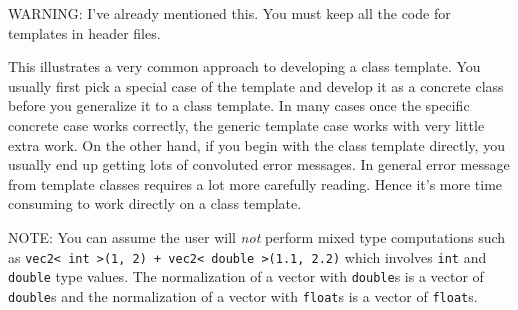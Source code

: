 
WARNING: I've already mentioned this. You must keep all the code for
templates in header files. 

This illustrates a very common approach to developing a class template.
You usually first pick a special case of the template and develop it as a
concrete class before you generalize it to a class template.
In many cases once the specific concrete case works correctly,
the generic template case works with very little extra work.
On the other hand, if you begin with the class template directly,
you usually end up getting lots of convoluted error messages.
In general error message from template classes requires a lot more
carefully reading. Hence it's more time consuming to work directly on
a class template.
 
NOTE: You can assume the user will \textit{not} perform
mixed type computations such as 
\texttt{vec2< int >(1, 2) + vec2< double >(1.1, 2.2)} which involves
\verb!int! and \verb!double! type values.
The
normalization of a vector with \texttt{double}s is a vector of \texttt{double}s
and the
normalization of a vector with \texttt{float}s is a vector of \texttt{float}s.
